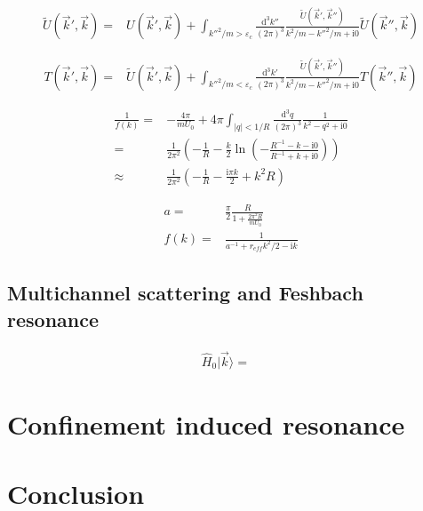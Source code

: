 \documentclass[aps,twocolumn,secnumarabic,balancelastpage,amsmath,amssymb,nofootinbib]{revtex4}
\newcommand{\ud}{\mathrm{d}}
\newcommand{\ui}{\mathrm{i}}
\newcommand{\eqar}[1]
{
  \begin{align*}
    #1
  \end{align*}
}
\newcommand{\paren}[1]{{\left({#1}\right)}}
\newcommand{\abs}[1]{{\left|{#1}\right|}}
\begin{document}
\eqar{
  \tilde U\paren{\vec k', \vec k}=&U\paren{\vec k', \vec k}+\int_{k''^2/m>\varepsilon_c}\frac{\ud^3 k''}{\paren{2\pi}^3}\frac{\tilde U\paren{\vec k', \vec k''}}{k^2/m-k''^2/m+\ui 0}\tilde U\paren{\vec k'', \vec k}
}
\eqar{
  T\paren{\vec k', \vec k}=&\tilde U\paren{\vec k', \vec k}+\int_{k''^2/m<\varepsilon_c}\frac{\ud^3 k'}{\paren{2\pi}^3}\frac{\tilde U\paren{\vec k', \vec k''}}{k^2/m-k''^2/m+\ui0}T\paren{\vec k'', \vec k}
}
\eqar{
  \frac{1}{f\paren{k}}=&-\frac{4\pi}{mU_0}+4\pi\int_{\abs{q}<1/R}\frac{\ud^3q}{\paren{2\pi}^3}\frac{1}{k^2-q^2+\ui0}\\
  =&\frac{1}{2\pi^2}\paren{-\frac{1}{R}-\frac{k}{2}\ln\paren{-\frac{R^{-1}-k-\ui0}{R^{-1}+k+\ui0}}}\\
  \approx&\frac{1}{2\pi^2}\paren{-\frac{1}{R}-\frac{\ui\pi k}{2}+k^2R}
}

\eqar{
  a=&\frac{\pi}{2}\frac{R}{1+\frac{2\pi^2R}{mU_0}}\\
  f\paren{k}=&\frac{1}{a^{-1}+r_{eff}k^2/2-\ui k}
}

\subsection{Multichannel scattering and Feshbach resonance}
\eqar{
  \hat H_0|\vec k\rangle=&
}



\section{Confinement induced resonance}





\section{Conclusion}


\end{document}
